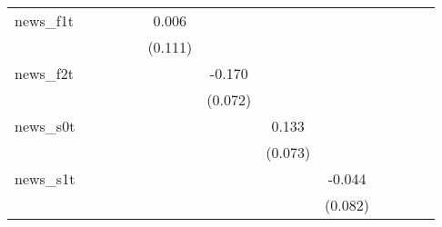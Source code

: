 {\begin{tabular}{l*{12}{c}}
\addlinespace
news\_f1t    &                     &                     &                     &                     &       0.006         &                     &                     &                     &                     &                     &                     &                     \\
            &                     &                     &                     &                     &     (0.111)         &                     &                     &                     &                     &                     &                     &                     \\
\addlinespace
news\_f2t    &                     &                     &                     &                     &                     &      -0.170\sym{**} &                     &                     &                     &                     &                     &                     \\
            &                     &                     &                     &                     &                     &     (0.072)         &                     &                     &                     &                     &                     &                     \\
\addlinespace
news\_s0t    &                     &                     &                     &                     &                     &                     &       0.133\sym{*}  &                     &                     &                     &                     &                     \\
            &                     &                     &                     &                     &                     &                     &     (0.073)         &                     &                     &                     &                     &                     \\
\addlinespace
news\_s1t    &                     &                     &                     &                     &                     &                     &                     &      -0.044         &                     &                     &                     &                     \\
            &                     &                     &                     &                     &                     &                     &                     &     (0.082)         &                     &                     &                     &                     \\

\end{tabular}}
